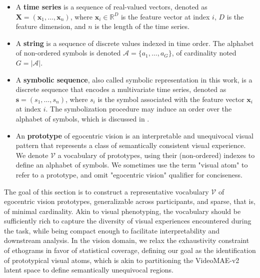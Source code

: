    \begin{itemize}
        \item A \textbf{time series} is a sequence of real-valued vectors, denoted as $\mathbf{X} = (\mathbf{x}_1,\ldots, \mathbf{x}_n)$, where $\mathbf{x}_i \in \mathbb{R}^D$ is the feature vector at index $i$, $D$ is the feature dimension, and $n$ is the length of the time series. 

        \item A \textbf{string} is a sequence of discrete values indexed in time order. The alphabet of non-ordered symbols is denoted $\mathcal{A} = \{a_1, \ldots, a_G\}$, of cardinality noted $G=|\mathcal{A}|$.

        \item A \textbf{symbolic sequence}, also called symbolic representation in this work, is a discrete sequence that encodes a multivariate time series, denoted as $\mathbf{s} = (s_1, \ldots, s_n)$, where $s_i$ is the symbol associated with the feature vector $\mathbf{x}_i$ at index $i$. The symbolization procedure may induce an order over the alphabet of symbols, which is discussed in .

        \item An \textbf{prototype} of egocentric vision is an interpretable and unequivocal visual pattern that represents a class of semantically consistent visual experience. We denote $\mathcal{V}$ a vocabulary of prototypes, using their (non-ordered) indexes to define an alphabet of symbols. We sometimes use the term "visual atom" to refer to a prototype, and omit "egocentric vision" qualifier for conciseness.


    \end{itemize}

    The goal of this section is to construct a representative vocabulary $\mathcal{V}$ of egocentric vision prototypes, generalizable across participants, and sparse, that is, of minimal cardinality. Akin to visual phenotyping, the vocabulary should be sufficiently rich to capture the diversity of visual experiences encountered during the task, while being compact enough to facilitate interpretability and downstream analysis. In the vision domain, we relax the exhaustivity constraint of ethograms in favor of statistical coverage, defining our goal as the identification of prototypical visual atoms, which is akin to partitioning the VideoMAE-v2 latent space to define semantically unequivocal regions. %

